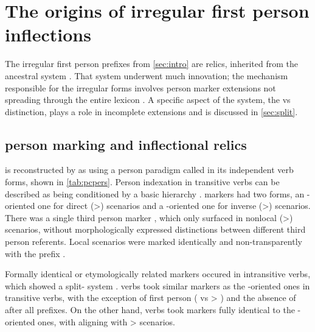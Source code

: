 \section{The origins of irregular first person inflections}
\label{sec:background}
The irregular first person prefixes from \cref{sec:intro} are relics, inherited from the ancestral \PC system .
That system underwent much innovation; the mechanism responsible for the irregular forms involves person marker extensions not spreading through the entire  lexicon .
A specific aspect of the system, the  vs  distinction, plays a role in incomplete extensions and is discussed in \cref{sec:split}.

\subsection{\PC person marking and inflectional relics}
\label{sec:pc_person}
\PC is reconstructed by \textcite{gildea1998} as using a person paradigm called \setone in its independent verb forms, shown in \cref{tab:pcpers}.
Person indexation in transitive verbs can be described as being conditioned by a basic hierarchy .
 markers had two forms, an -oriented one for direct (>) scenarios and a -oriented one for inverse (>) scenarios.
There was a single third person marker , which only surfaced in nonlocal (>) scenarios, without morphologically expressed distinctions between different third person referents.
Local scenarios were marked identically and non-transparently with the  prefix .



Formally identical or etymologically related markers occured in intransitive verbs, which showed a split- system .
 verbs took similar markers as the -oriented ones in transitive verbs, with the exception of first person (  vs > ) and the absence of  after all  prefixes.
On the other hand,  verbs took markers fully identical to the -oriented ones, with   aligning with > scenarios.

